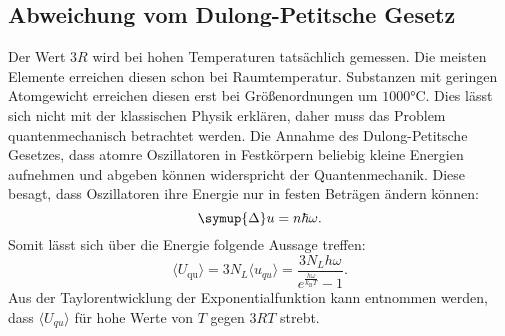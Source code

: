 \subsection{Abweichung vom Dulong-Petitsche Gesetz}
Der Wert $3R$ wird bei hohen Temperaturen tatsächlich gemessen.
Die meisten Elemente erreichen diesen schon bei Raumtemperatur.
Substanzen mit geringen Atomgewicht erreichen diesen erst bei 
Größenordnungen um $1000\si{\celsius}$.
Dies lässt sich nicht mit der klassischen Physik erklären, 
daher muss das Problem quantenmechanisch betrachtet werden.
Die Annahme des Dulong-Petitsche Gesetzes, dass atomre Oszillatoren in Festkörpern 
beliebig kleine Energien aufnehmen und abgeben können widerspricht der Quantenmechanik.
Diese besagt, dass Oszillatoren ihre Energie nur in festen Beträgen ändern können:
\begin{equation}
\symup{\Delta} u = n \hbar \omega .
\end{equation}
Somit lässt sich über die Energie folgende Aussage treffen:
\begin{equation}
\langle U_\text{qu} \rangle = 3 N_L \langle u_{qu} \rangle = \frac{3 N_L h 
\omega}{e^{\frac{h\omega}{k_\text{B}T}}-1} .
\end{equation}
Aus der Taylorentwicklung der Exponentialfunktion kann entnommen werden, 
dass $\langle U_{qu} \rangle$ für hohe Werte von $T$ gegen $3RT$ strebt.
